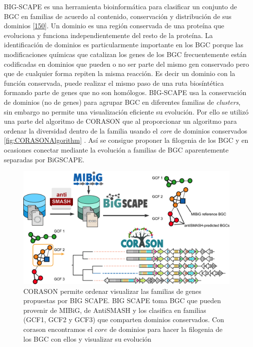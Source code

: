 \documentclass[12pt,twoside]{reedthesis}
\begin{document}
  BIG-SCAPE es una herramienta bioinformática para clasificar un conjunto
  de BGC en familias de acuerdo al contenido, conservación y distribución
  de sus dominios
  {[}\protect\hyperlink{ref-navarro-munoz_computational_2018}{150}{]}. Un
  dominio es una región conservada de una proteína que evoluciona y
  funciona independientemente del resto de la proteína. La identificación
  de dominios es particularmente importante en los BGC porque las
  modificaciones químicas que catalizan los genes de los BGC
  frecuentemente están codificadas en dominios que pueden o no ser parte
  del mismo gen conservado pero que de cualquier forma repiten la misma
  reacción. Es decir un dominio con la función conservada, puede realizar
  el mismo paso de una ruta biosíntética formando parte de genes que no
  son homólogos. BIG-SCAPE usa la conservación de dominios (no de genes)
  para agrupar BGC en diferentes familias de \emph{clusters}, sin embargo
  no permite una visualización eficiente su evolución. Por ello se utilizó
  una parte del algoritmo de CORASON que al proporcionar un algoritmo para
  ordenar la diversidad dentro de la familia usando el \emph{core} de
  dominios conservados \autoref{fig:CORASONAlgorithm} . Así se consigue
  proponer la filogenia de los BGC y en ocasiones conectar mediante la
  evolución a familias de BGC aparentemente separadas por BiGSCAPE.
  
  \begin{figure}[h!tbp]
  \centering
  \includegraphics[angle = 0,scale = .3]{chapter3/corason_fig1.png}
  \caption[Algoritmo de CORASON Algorithm]{\footnotesize{CORASON permite ordenar visualizar las familias de genes propuestas por BIG SCAPE. BIG SCAPE toma BGC que pueden provenir de MIBiG, de AntiSMASH y los clasifica en familias (GCF1, GCF2 y GCF3) que comparten dominios conservados. Con corason encontramos el $core$ de dominios para hacer la filogenia de los BGC con ellos y visualizar su evolución }}
  \label{fig:CORASONAlgorithm}
  \end{figure}
  
\end{document}
